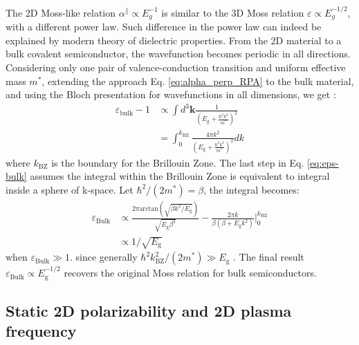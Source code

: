 \documentclass[manuscript=suppinfo,email=true,hyperref=true,keywords=false]{achemso}
\begin{document}
The 2D Moss-like relation $\alpha^{\parallel} \propto E_{g}^{-1}$ is
similar to the 3D Moss relation $\varepsilon \propto E_{g}^{-1/2}$,
with a different power law. Such difference in the power law can
indeed be explained by modern theory of dielectric properties. From
the 2D material to a bulk covalent semiconductor, the wavefunction
becomes periodic in all directions. Considering only one pair of
valence-conduction transition and uniform effective mass $m^{*}$,
extending the approach Eq. \ref{eq:alpha_perp_RPA} to the bulk
material, and using the Bloch presentation for wavefunctions in all
dimensions, we get \cite{Jiang_2017_Eg_Eb}:
\begin{equation}
  \begin{aligned}
    \label{eq:eps-bulk}
    \varepsilon_{\mathrm{bulk}} - 1 &\propto \int d^{3}\mathbf{k}
    {\displaystyle \frac{1}{(E_{\mathrm{g}} + {\displaystyle
          \frac{\hbar^{2} k^{2}}{m^{*}}})^{2}}}\\
    &= \int_{0}^{k_{\mathrm{BZ}}} {\displaystyle
      \frac{4 \pi k^{2}}{(E_{\mathrm{g}} + {\displaystyle \frac{\hbar^{2}
            k^{2}}{m^{*}}})^{2}}} dk
  \end{aligned}
\end{equation}
where $k_{\mathrm{BZ}}$ is the boundary for the Brillouin Zone. The
last step in Eq. \ref{eq:eps-bulk} assumes the integral within the
Brillouin Zone is equivalent to integral inside a sphere of
k-space. Let $\hbar^{2}/(2 m^{*})=\beta$, the integral becomes:
\begin{equation}
  \begin{aligned}
    \label{eq:integral-BZ-bulk}
    \varepsilon_{\mathrm{Bulk}} &\propto {\displaystyle \frac{2 \pi
        \mathrm{arctan}(\sqrt{\beta k^{2}/E_{\mathrm{g}}})}{\sqrt{E_{\mathrm{g}} \beta^{3}}}
        - \frac{2\pi k}{\beta(\beta +E_{\mathrm{g}}k^{2})}
      } \bigg\rvert_{0}^{k_{\mathrm{BZ}}}\\
      &\propto 1/\sqrt{E_{\mathrm{g}}}
  \end{aligned}
\end{equation}
when $\varepsilon_{\mathrm{Bulk}} \gg 1$. since generally
$\hbar^{2}k_{\mathrm{BZ}}^{2}/(2m^{*}) \gg
E_{\mathrm{g}}$ \cite{Finkenrath_1988}. The final result $\varepsilon_{\mathrm{Bulk}} \propto E_{\mathrm{g}}^{-1/2}$ recovers the original Moss relation for bulk semiconductors.


\subsection{Static 2D polarizability and 2D plasma frequency}
\label{ssec:omega-p}
\end{document}
